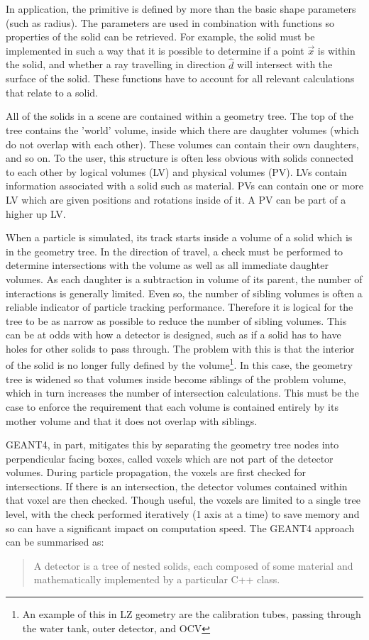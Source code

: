 \par
In application, the primitive is defined by more than the basic shape parameters (such as radius).
The parameters are used in combination with functions so properties of the solid can be retrieved.
For example, the solid must be implemented in such a way that it is possible to determine if a point $\vec{x}$ is within the solid, and whether a ray travelling in direction $\hat{d}$ will intersect with the surface of the solid.
These functions have to account for all relevant calculations that relate to a solid.
\par
All of the solids in a scene are contained within a geometry tree.
The top of the tree contains the 'world' volume, inside which there are daughter volumes (which do not overlap with each other).
These volumes can contain their own daughters, and so on.
To the user, this structure is often less obvious with solids connected to each other by logical volumes (LV) and physical volumes (PV).
LVs contain information associated with a solid such as material. 
PVs can contain one or more LV which are given positions and rotations inside of it. 
A PV can be part of a higher up LV.
\par
When a particle is simulated, its track starts inside a volume of a solid which is in the geometry tree.
In the direction of travel, a check must be performed to determine intersections with the volume as well as all immediate daughter volumes.
As each daughter is a subtraction in volume of its parent, the number of interactions is generally limited.
Even so, the number of sibling volumes is often a reliable indicator of particle tracking performance.
Therefore it is logical for the tree to be as narrow as possible to reduce the number of sibling volumes.
This can be at odds with how a detector is designed, such as if a solid has to have holes for other solids to pass through.
The problem with this is that the interior of the solid is no longer fully defined by the volume\footnote{An example of this in LZ geometry are the calibration tubes, passing through the water tank, outer detector, and OCV}.
In this case, the geometry tree is widened so that volumes inside become siblings of the problem volume, which in turn increases the number of intersection calculations.
This must be the case to enforce the requirement that each volume is contained entirely by its mother volume and that it does not overlap with siblings.
\par
GEANT4, in part, mitigates this by separating the geometry tree nodes into perpendicular facing boxes, called voxels \cite{geant4_voxel_ref} which are not part of the detector volumes.
During particle propagation, the voxels are first checked for intersections.
If there is an intersection, the detector volumes contained within that voxel are then checked.
Though useful, the voxels are limited to a single tree level, with the check performed iteratively (1 axis at a time) to save memory and so can have a significant impact on computation speed.
The GEANT4 approach can be summarised as:
\begin{quote}
    A detector is a tree of nested solids, each composed of some material and mathematically implemented by a particular C++ class.
\end{quote}

